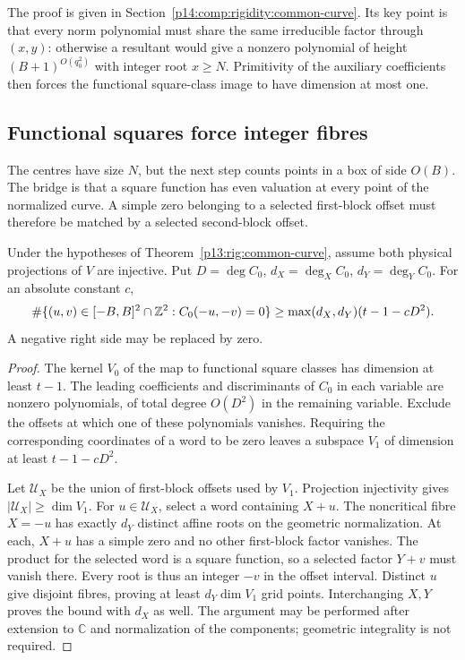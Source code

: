The proof is given in Section~\ref{p14:comp:rigidity:common-curve}.
Its key point is that every norm polynomial must share the same
irreducible factor through $(x,y)$: otherwise a resultant would give
a nonzero polynomial of height $(B+1)^{O(q_0^2)}$ with integer root
$x\ge N$.  Primitivity of the auxiliary coefficients then forces the
functional square-class image to have dimension at most one.

\subsection{Functional squares force integer fibres}

The centres have size $N$, but the next step counts points
in a box of side $O(B)$.  The bridge is that a square
function has even valuation at every point of the normalized
curve.  A simple zero belonging to a selected first-block
offset must therefore be matched by a selected second-block
offset.

\begin{proposition}
\label{p13:rig:grid-fibres}
Under the hypotheses of Theorem~\ref{p13:rig:common-curve},
assume both physical projections of $V$ are injective.
Put $D=\deg C_0$, $d_X=\deg_XC_0$, $d_Y=\deg_YC_0$.
For an absolute constant $c$,
\begin{equation}
 \#\{(u,v)\in[-B,B]^2\cap\mathbb Z^2:C_0(-u,-v)=0\}
       \ge\max(d_X,d_Y)(t-1-cD^2).
 \label{p13:rig:grid-count}
\end{equation}
A negative right side may be replaced by zero.
\end{proposition}

\begin{proof}
The kernel $V_0$ of the map to functional square classes
has dimension at least $t-1$.  The leading coefficients
and discriminants of $C_0$ in each variable are nonzero
polynomials, of total degree $O(D^2)$ in the remaining
variable.  Exclude the offsets at which one of these
polynomials vanishes.  Requiring the corresponding
coordinates of a word to be zero leaves a subspace $V_1$
of dimension at least $t-1-cD^2$.

Let $\mathcal U_X$ be the union of first-block offsets used
by $V_1$.  Projection injectivity gives
$|\mathcal U_X|\ge\dim V_1$.
For $u\in\mathcal U_X$, select a word containing $X+u$.
The noncritical fibre $X=-u$ has exactly $d_Y$ distinct
affine roots on the geometric normalization.  At each,
$X+u$ has a simple zero and no other first-block factor
vanishes.  The product for the selected word is a square
function, so a selected factor $Y+v$ must vanish there.
Every root is thus an integer $-v$ in the offset interval.
Distinct $u$ give disjoint fibres, proving at least
$d_Y\dim V_1$ grid points.  Interchanging $X,Y$ proves
the bound with $d_X$ as well.
The argument may be performed after extension to
$\mathbb C$ and normalization of the components; geometric
integrality is not required.
\end{proof}

